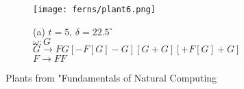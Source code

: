 \begin{figure}[tbh]
\begin{center}
\begin{subfigure}[tbh]{0.3\textwidth}
\begin{center}
	\end{center}
	\end{subfigure}
\hfill
	\begin{subfigure}[tbh]{0.3\textwidth}
	\begin{center}
	\texttt{[image: ferns/plant6.png]}
	\caption{(a) $t = 5$, $\delta = 22.5^{\circ}$ \\ $\omega: G$ \\ $G\rightarrow FG[-F[G]-G][G+G][+F[G]+G]$ \\ $F \rightarrow FF$}
	\end{center}
	\end{subfigure}
\hfill
\end{center}
\caption{ Plants from "Fundamentals of Natural Computing}
\end{figure} \label{bookPlants}

